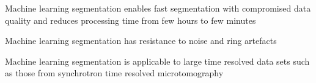 \documentclass[draft,linenumbers]{agujournal2018}
\begin{document}




\begin{keypoints}
\item Machine learning segmentation enables fast segmentation with compromised data quality and reduces processing time from few hours to few minutes
\item Machine learning segmentation has resistance to noise and ring artefacts
\item Machine learning segmentation is applicable to large time resolved data sets such as those from synchrotron time resolved microtomography

\end{keypoints}

%
%

\end{document}
